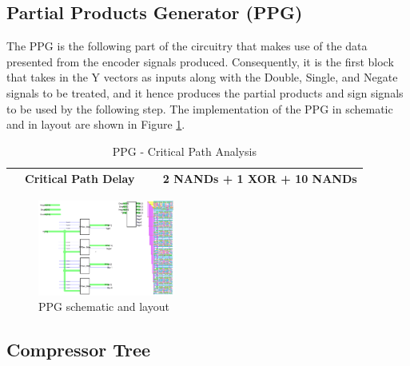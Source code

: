 \documentclass[journal]{IEEEtran}
\begin{document}
\vspace{-10pt}

\subsection{Partial Products Generator (PPG)}

The PPG is the following part of the circuitry that makes use of the data presented from the encoder signals produced. Consequently, it is the first block that takes in the Y vectors as inputs along with the Double, Single, and Negate signals to be treated, and it hence produces the partial products and sign signals to be used by the following step. The implementation of the PPG in schematic and in layout are shown in Figure \ref{fig:5}.

\begin{table}[!h]
\renewcommand{\arraystretch}{1.5}
\caption{PPG - Critical Path Analysis}
\label{tab:t3}
\centering
\begin{tabular}{|c|c|}
\hline
~~Critical Path Delay ~~ & 2 NANDs + 1 XOR + 10 NANDs\\
\hline
\end{tabular}
\end{table}

\newpage

\begin{figure}[h!]
  \centering
  \includegraphics[width=0.4\textwidth]{5.png}
  \centering
  \caption{PPG schematic and layout}
  \label{fig:5}
\end{figure}

\vspace{-10pt}

\subsection{Compressor Tree}
\end{document}
